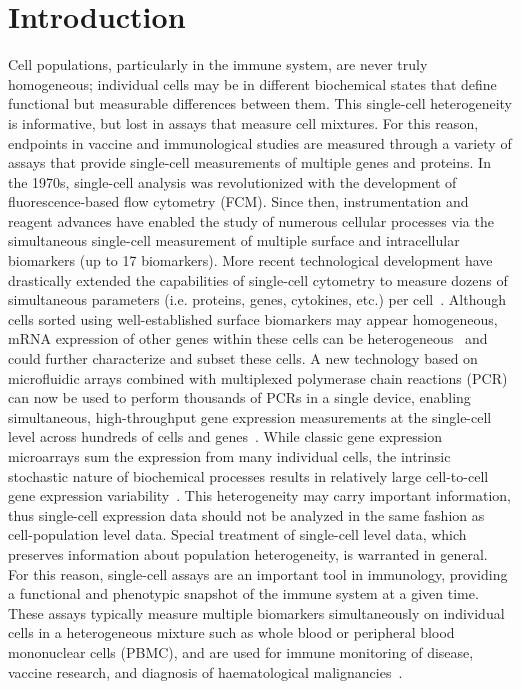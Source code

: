 \documentclass[12pt,oupdraft]{biostatistics}
\begin{document}
\clearpage
\section{Introduction}
\label{s:intro}
Cell populations, particularly in the immune system, are never truly homogeneous; individual cells may be in different biochemical states that define functional but measurable differences between them.
This single-cell heterogeneity is informative, but lost in assays that measure cell mixtures.
For this reason, endpoints in vaccine and immunological studies are measured through a variety of assays that provide single-cell measurements of multiple genes and proteins.
In the 1970s, single-cell analysis was revolutionized with the development of fluorescence-based flow cytometry (FCM).
Since then, instrumentation and reagent advances have enabled the study of numerous cellular processes via the simultaneous single-cell measurement of multiple surface and intracellular biomarkers (up to 17 biomarkers).
More recent technological development have drastically extended the capabilities of single-cell cytometry to measure dozens of simultaneous parameters (i.e. proteins, genes, cytokines, etc.) per cell~\citep{Bendall:2011wf}.
Although cells sorted using well-established surface biomarkers may appear homogeneous, mRNA expression of other genes within these cells can be heterogeneous~\citep{Narsinh:2011gn, Flatz:2011jb} and could further characterize and subset these cells.
A new technology based on microfluidic arrays combined with multiplexed polymerase chain reactions (PCR) can now be used to perform thousands of PCRs in a single device, enabling simultaneous, high-throughput gene expression measurements at the single-cell level across hundreds of cells and genes~\citep{Pieprzyk:2009uc}.
While classic gene expression microarrays sum the expression from many individual cells, the intrinsic stochastic nature of biochemical processes results in relatively large cell-to-cell gene expression variability~\citep{vanOudenaarden200915a}.
This heterogeneity may carry important information, thus single-cell expression data should not be analyzed in the same fashion as cell-population level data.
Special treatment of single-cell level data, which preserves information about population heterogeneity, is warranted in general.
For this reason, single-cell assays are an important tool in immunology, providing a functional and phenotypic snapshot of the immune system at a given time.
These assays typically measure multiple biomarkers simultaneously on individual cells in a heterogeneous mixture such as whole blood or peripheral blood mononuclear cells  (PBMC), and are used for immune monitoring of disease, vaccine research, and diagnosis of haematological malignancies~\citep{Altman:1996wf,Betts:2006dw,Inokuma:2007tn}.
\end{document}

